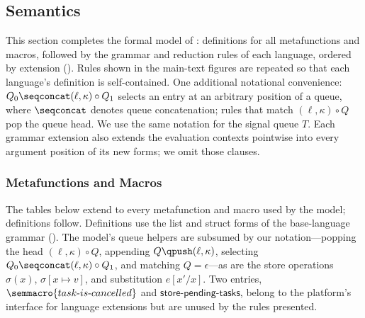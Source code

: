 
\subsection{Semantics}\label{app:semantics}

This section completes the formal model of : definitions for all metafunctions and macros, followed by the grammar and reduction rules of each language, ordered by extension (). Rules shown in the main-text figures are repeated so that each language's definition is self-contained. One additional notational convenience: $Q_0 \seqconcat (\ell, \kappa) \circ Q_1$ selects an entry at an arbitrary position of a queue, where $\seqconcat$ denotes queue concatenation; rules that match $(\ell, \kappa) \circ Q$ pop the queue head. We use the same notation for the signal queue $T$. Each grammar extension also extends the evaluation contexts pointwise into every argument position of its new forms; we omit those clauses.

\subsubsection{Metafunctions and Macros}\label{app:semantics:metafunctions}

The tables below extend  to every metafunction and macro used by the model; definitions follow. Definitions use the list and struct forms of the base-language grammar (). The model's queue helpers are subsumed by our notation---popping the head $(\ell, \kappa) \circ Q$, appending $Q \qpush (\ell, \kappa)$, selecting $Q_0 \seqconcat (\ell, \kappa) \circ Q_1$, and matching $Q = \epsilon$---as are the store operations $\sigma(x)$, $\sigma[x \mapsto v]$, and substitution $e[x'/x]$. Two entries, $\semmacro{task\text{-}is\text{-}cancelled}$ and $\mathsf{store\text{-}pending\text{-}tasks}$, belong to the platform's interface for language extensions but are unused by the rules presented.

